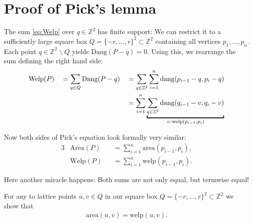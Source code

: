 \documentclass[a4paper]{amsart}
\numberwithin{equation}{section}
\theoremstyle{plain}
\theoremstyle{definition}
\newcommand{\Z}{\mathbb{Z}}
\newcommand{\minus}{\smallsetminus}
\newcommand{\area}{\mathrm{area}}
\newcommand{\Area}{\mathrm{Area}}
\newcommand{\dang}{\mathrm{dang}}
\newcommand{\Dang}{\mathrm{Dang}}
\newcommand{\welp}{\mathrm{welp}}
\newcommand{\Welp}{\mathrm{Welp}}
\begin{document}
\section{Proof of Pick's lemma}

The sum \eqref{eq:Welp} over $q \in \Z^2$ has finite support:
We can restrict it to a sufficiently large
square box $Q = \{-r,\ldots,r\}^2 \subset \Z^2$
containing all vertices $p_1,\ldots,p_n$.
Each point $q \in \Z^2 \minus Q$ yields $\Dang(P-q) = 0$.
Using this, we rearrange the sum defining the right hand side:
\begin{alignat}{3}
  & \Welp(P)
  && = \sum_{q \in Q} \Dang(P-q)
  && = \sum_{q \in \Z^2} \sum_{i=1}^n \dang(p_{i-1}-q, p_i-q) 
  \\ \notag & && && = \sum_{i=1}^n
  \underbracket{ \sum_{q \in \Z^2} \dang(q_{i-1}-v, q_i-v) }_{\normalsize =: \welp(p_{i-1},p_i)}
\end{alignat}

Now both sides of Pick's equation look formally very similar:
\begin{alignat}{3}
  & \Area(P) && = \sum_{i=1}^{n} \area(p_{i-1},p_i) ,
  \\
  & \Welp(P) && = \sum_{i=1}^n \welp(p_{i-1},p_i) .
\end{alignat}

Here another miracle happens:
Both sums are not only equal, but termwise equal!

For any to lattice points $u,v \in Q$
in our square box $Q = \{-r,\ldots,r\}^2 \subset \Z^2$
we show that
\begin{align}
  \area(u,v) = \welp(u,v) .
\end{align}
\end{document}
